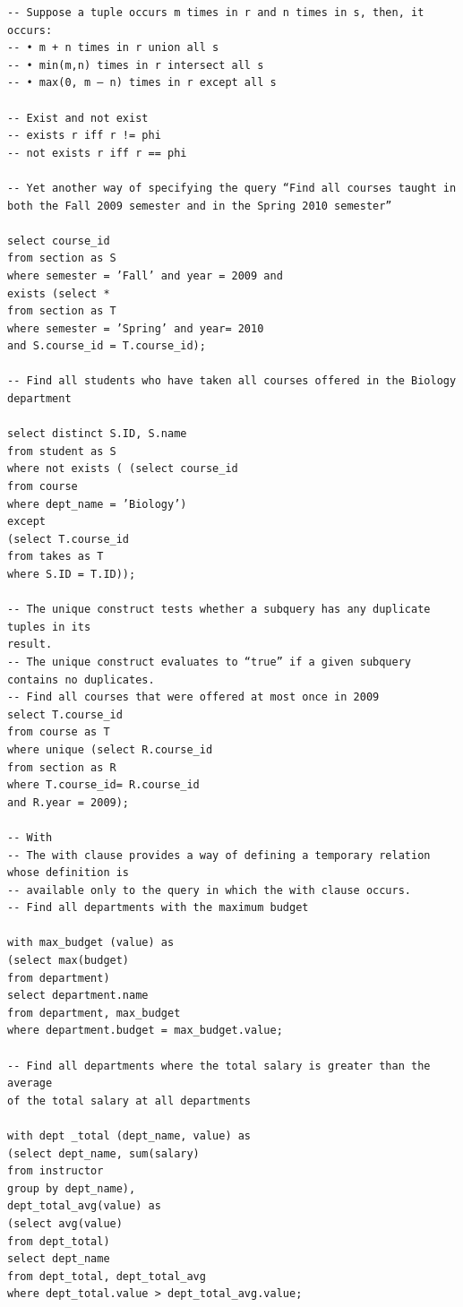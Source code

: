 \documentclass[8pt, a4paper, oneside, twocolumn]{extarticle}
\begin{document}
\begin{verbatim}
-- Suppose a tuple occurs m times in r and n times in s, then, it occurs:
-- • m + n times in r union all s
-- • min(m,n) times in r intersect all s
-- • max(0, m – n) times in r except all s

-- Exist and not exist
-- exists r iff r != phi
-- not exists r iff r == phi

-- Yet another way of specifying the query “Find all courses taught in both the Fall 2009 semester and in the Spring 2010 semester”

select course_id
from section as S
where semester = ’Fall’ and year = 2009 and
exists (select *
from section as T
where semester = ’Spring’ and year= 2010
and S.course_id = T.course_id);

-- Find all students who have taken all courses offered in the Biology department

select distinct S.ID, S.name
from student as S
where not exists ( (select course_id
from course
where dept_name = ’Biology’)
except
(select T.course_id
from takes as T
where S.ID = T.ID));

-- The unique construct tests whether a subquery has any duplicate tuples in its
result.
-- The unique construct evaluates to “true” if a given subquery contains no duplicates.
-- Find all courses that were offered at most once in 2009
select T.course_id
from course as T
where unique (select R.course_id
from section as R
where T.course_id= R.course_id
and R.year = 2009);

-- With
-- The with clause provides a way of defining a temporary relation whose definition is
-- available only to the query in which the with clause occurs.
-- Find all departments with the maximum budget

with max_budget (value) as
(select max(budget)
from department)
select department.name
from department, max_budget
where department.budget = max_budget.value;

-- Find all departments where the total salary is greater than the average
of the total salary at all departments

with dept _total (dept_name, value) as
(select dept_name, sum(salary)
from instructor
group by dept_name),
dept_total_avg(value) as
(select avg(value)
from dept_total)
select dept_name
from dept_total, dept_total_avg
where dept_total.value > dept_total_avg.value;


\end{verbatim}
\end{document}
